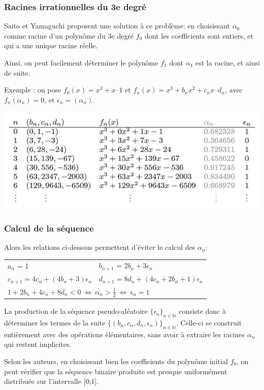 \documentclass{scrartcl}
\begin{document}
\subsubsection{Racines irrationnelles du 3e degré}
Saito et Yamaguchi \cite{SY} proposent une solution à ce problème: en
choisissant $\alpha_0$ comme racine d’un polynôme du 3e degré $f_0$ dont les
coefficients sont entiers, et qui a une unique racine réelle. \par
Ainsi, on peut facilement déterminer le polynôme $f_1$ dont $\alpha_1$ est la
racine, et ainsi de suite. \par
Exemple : on pose $f_0(x) = x^3+x–1$ et $f_n(x) = x^3+b_nx^2+c_nx–d_n$, avec
$f_n(\alpha_n) = 0$, et $\epsilon_n = (\alpha_n)$.
\begin{center}
  \includegraphics[scale=0.75]{img/SaitoYamaguchi2017.png}  
\end{center}

\subsubsection{Calcul de la séquence}
Alors les relations ci-dessous permettent d'éviter le calcul des $\alpha_n$:\par
\begin{tabular}{ l l }
  $a_n$ = 1 & $b_{n+1}$ = $2b_n+3\epsilon_n$ \\
  $c_{n+1} = 4c_n+(4b_n+3)\epsilon_n$ 
            & $d_{n+1} = 8d_n+(4c_n+2b_n+1)\epsilon_n$ \\
  \multicolumn{2}{l}{$1 + 2b_n + 4c_n + 8d_n < 0 \ \Leftrightarrow \ \alpha_n > \frac{1}{2} \ \Leftrightarrow \ \epsilon_n = 1 $}
\end{tabular}\par
La production de la séquence pseudo-aléatoire
$\{\epsilon_n\}_{n \in \mathbb{N}}$ consiste donc à déterminer les termes de la
suite $\{ (b_n,c_n,d_n,\epsilon_n) \}_{n \in \mathbb{N}}$. Celle-ci se construit
entièrement avec des opérations élémentaires, sans avoir à extraire les racines
$\alpha_n$ qui restent implicites. \par
\medskip Selon les auteurs, en choisissant bien les coefficients du polynôme
initial $f_0$, on peut vérifier que la séquence binaire produite est presque
uniformément distribuée sur l’intervalle [0;1]. \par
\end{document}
